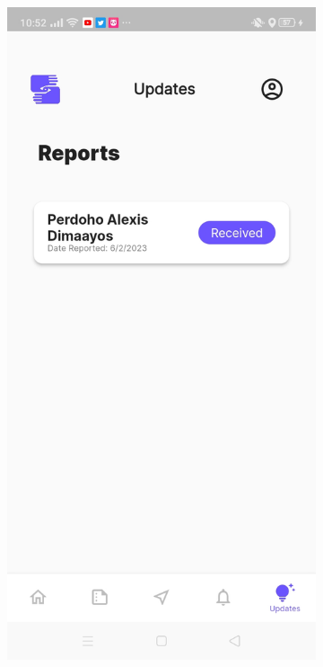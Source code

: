 \begin{figure}[!h]
    \centering
    \begin{subfigure}[c]{0.20\linewidth}
        \centering
        \includegraphics[scale=0.10]{figures/Chapter4/Main/Report-1.jpg}

\end{subfigure}
\end{figure}
